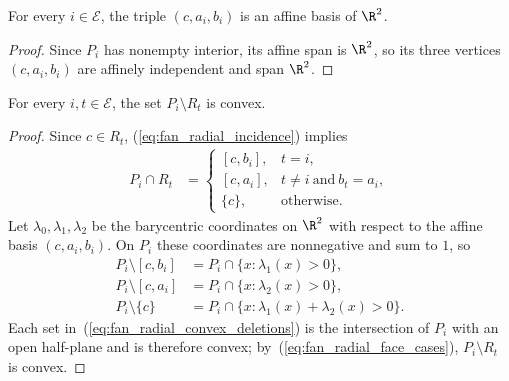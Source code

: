 \begin{lemma}
    \label{thm:area_law_fan_triangle_affine_basis}
    \leanok
    For every $i\in\mathcal E$, the triple $(c,a_i,b_i)$
    is an affine basis of $\R^2$.
\end{lemma}
\begin{proof}\leanok
    Since $P_i$ has nonempty interior, its affine span is $\R^2$, so its three
    vertices $(c,a_i,b_i)$ are affinely independent and span $\R^2$.
\end{proof}

\begin{lemma}
    \label{thm:area_law_fan_radial_deletion_convex}
    \leanok
    For every $i,t\in\mathcal E$, the set $P_i\setminus R_t$ is convex.
\end{lemma}
\begin{proof}\leanok
    Since $c\in R_t$, (\ref{eq:fan_radial_incidence}) implies
    \begin{align}
        P_i\cap R_t & =
        \begin{cases}
            [c,b_i], & t=i,                         \\
            [c,a_i], & t\ne i\ \text{and}\ b_t=a_i, \\
            \{c\},   & \text{otherwise}.
        \end{cases}
        \label{eq:fan_radial_face_cases}
    \end{align}
    Let $\lambda_0,\lambda_1,\lambda_2$ be the barycentric coordinates on
    $\R^2$ with respect to the affine basis $(c,a_i,b_i)$. On $P_i$ these
    coordinates are nonnegative and sum to $1$, so
    \begin{align}
        P_i\setminus[c,b_i]
         & =P_i\cap\{x:\lambda_1(x)>0\},              \\
        P_i\setminus[c,a_i]
         & =P_i\cap\{x:\lambda_2(x)>0\},              \\
        P_i\setminus\{c\}
         & =P_i\cap\{x:\lambda_1(x)+\lambda_2(x)>0\}.
        \label{eq:fan_radial_convex_deletions}
    \end{align}
    Each set in~(\ref{eq:fan_radial_convex_deletions}) is the intersection of
    $P_i$ with an open half-plane and is therefore convex; by~(\ref{eq:fan_radial_face_cases}),
    $P_i\setminus R_t$ is convex.
\end{proof}

